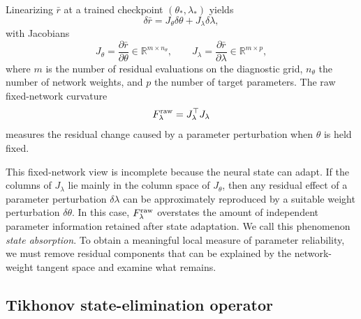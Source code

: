 \documentclass[preprint,12pt]{elsarticle}
\newcommand{\R}{\mathbb{R}}
\begin{document}
Linearizing $\bar r$ at a trained checkpoint $(\theta_\ast,\lambda_\ast)$ yields
\begin{equation}
    \delta\bar r = J_\theta\delta\theta + J_\lambda\delta\lambda,
    \label{eq:linearized_residual}
\end{equation}
with Jacobians
\begin{equation}
    J_\theta=\frac{\partial\bar r}{\partial\theta}\in\R^{m\times n_\theta},\qquad
    J_\lambda=\frac{\partial\bar r}{\partial\lambda}\in\R^{m\times p},
\end{equation}
where $m$ is the number of residual evaluations on the diagnostic grid, $n_\theta$ the number of network weights, and $p$ the number of target parameters.  The raw fixed-network curvature
\begin{equation}
    F_{\lambda}^{\rm raw}=J_\lambda^\top J_\lambda
    \label{eq:F_raw}
\end{equation}
measures the residual change caused by a parameter perturbation when $\theta$ is held fixed.

This fixed-network view is incomplete because the neural state can adapt.  If the columns of $J_\lambda$ lie mainly in the column space of $J_\theta$, then any residual effect of a parameter perturbation $\delta\lambda$ can be approximately reproduced by a suitable weight perturbation $\delta\theta$.  In this case, $F_{\lambda}^{\rm raw}$ overstates the amount of independent parameter information retained after state adaptation.  We call this phenomenon \emph{state absorption}.  To obtain a meaningful local measure of parameter reliability, we must remove residual components that can be explained by the network-weight tangent space and examine what remains.

\subsection{Tikhonov state-elimination operator}
\end{document}
